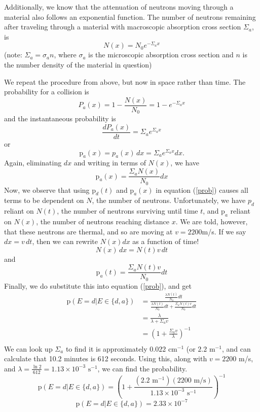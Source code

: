 \documentclass{report}
\begin{document}
Additionally, we know that the attenuation of neutrons moving through a material also follows an exponential function. The number of neutrons remaining after traveling through a material with macroscopic absorption cross section $\Sigma_a$, is
$$ N(x) = N_0 e^{-\Sigma_a x} $$
(note: $\Sigma_a = \sigma_a n$, where $\sigma_a$ is the microscopic absorption cross section and $n$ is the number density of the material in question) 

We repeat the procedure from above, but now in space rather than time. The probability for a collision is
$$ P_a(x) = 1-\frac{N(x)}{N_0} = 1 - e^{-\Sigma_a x} $$
and the instantaneous probability is 
$$ \frac{dP_a(x)}{dt} = \Sigma_a e^{\Sigma_a x} $$
or 
$$ \text{p}_a(x) = p_a(x) \, dx = \Sigma_a e^{\Sigma_a x} dx .$$
Again, eliminating $dx$ and writing in terms of $N(x)$, we have
$$ \text{p}_a(x) = \frac{\Sigma_a N(x)}{N_0} dx $$
Now, we observe that using $\text{p}_d(t)$ and $\text{p}_a(x)$ in equation (\ref{prob}) causes all terms to be dependent on $N$, the number of neutrons. Unfortunately, we have $p_d$ reliant on $N(t)$, the number of neutrons surviving until time $t$, and $\text{p}_a$ reliant on $N(x)$, the number of neutrons reaching distance $x$. We are told, however, that these neutrons are thermal, and so are moving at $v = 2200$m/s. If we say $dx = v \, dt$, then we can rewrite $N(x) dx$ as a function of time! 
$$ N(x) \, dx = N(t) v \, dt $$
and
$$ \text{p}_a(t) = \frac{\Sigma_a N(t) v}{N_0} dt $$
Finally, we do substitute this into equation (\ref{prob}), and get
\begin{align*}
\text{p}(E=d | E \in \{d,a\})	&= \frac{\frac{\lambda N(t)}{N_0} dt}{\frac{\lambda N(t)}{N_0} dt + \frac{\Sigma_a N(t) v}{N_0} dt}\\
								&= \frac{\lambda}{\lambda + \Sigma_a v}\\
								&= \left(1 + \frac{\Sigma_a v}{\lambda}\right)^{-1}\\
\end{align*}
We can look up $\Sigma_a$ to find it is approximately $0.022\text{ cm}^{-1}$ (or $2.2\text{ m}^{-1}$, and can calculate that 10.2 minutes is 612 seconds.  Using this, along with $v = 2200$ m/s, and $\lambda = \frac{\ln 2}{612} = 1.13\times10^{-3}\text{ s}^{-1}$, we can find the probability.
$$ \text{p}(E=d | E \in \{d,a\}) = \left(1 + \frac{(2.2\text{ m}^{-1})(2200\text{ m/s})}{1.13\times10^{-3}\text{ s}^{-1}}\right)^{-1} $$
$$\boxed{ \text{p}(E=d | E \in \{d,a\}) = 2.33\times10^{-7} }$$
\end{document}
